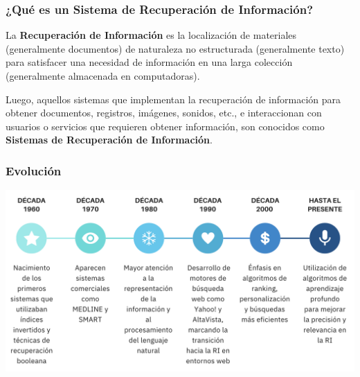 \documentclass[
	10pt, %
	aspectratio=169, %
]{beamer}
\begin{document}

\begin{frame}
	
	\frametitle{¿Qué es un Sistema de Recuperación de Información?}
	
	\begin{alertblock}{} 
		La \textbf{Recuperación de Información} es la localización de materiales (generalmente documentos) de naturaleza no estructurada (generalmente texto) para satisfacer una necesidad de información en una larga colección (generalmente almacenada en computadoras).
		
		\raggedleft{\textcolor{gray}{Manning, C. D., “Introduction to Information Retrieval”, Cap. 1, pág. 1}}
	\end{alertblock}
	
	\vspace{2\baselineskip}
	
	\pause
	Luego, aquellos sistemas que implementan la recuperación de información para obtener documentos, registros, imágenes, sonidos, etc., e interaccionan con usuarios o servicios que requieren obtener información, son conocidos como \textbf{Sistemas de Recuperación de Información}.
	
\end{frame}


\begin{frame}[fragile]
	
	\frametitle{Evolución}
	
	\centering
	\includegraphics[scale=0.55]{evolucion.png} 
	
\end{frame}

\end{document}
